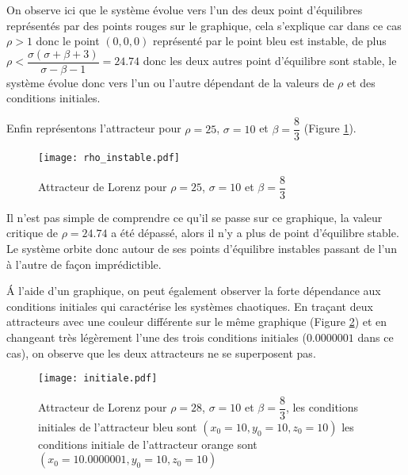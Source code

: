 On observe ici que le système évolue vers l'un des deux point d'équilibres représentés par des points rouges sur le graphique, cela s'explique car dans ce cas $\rho>1$ donc le point $(0,0,0)$ représenté par le point bleu est instable, de plus $\rho < \dfrac{\sigma(\sigma+\beta+3)}{\sigma-\beta-1}=24.74$ donc les deux autres point d'équilibre sont stable, le système évolue donc vers l'un ou l'autre dépendant de la valeurs de $\rho$ et des conditions initiales.  

Enfin représentons l'attracteur pour $\rho=25$, $\sigma=10$ et $\beta=\dfrac{8}{3}$ (Figure \ref{fig:rho_instable}).

\begin{figure}[!ht]
    \centering
    \texttt{[image: rho\_instable.pdf]}
    \caption{\label{fig:rho_instable}Attracteur de Lorenz pour $\rho=25$, $\sigma=10$ et $\beta=\dfrac{8}{3}$} 
\end{figure}

Il n'est pas simple de comprendre ce qu'il se passe sur ce graphique, la valeur critique de $\rho=24.74$ a été dépassé, alors il n'y a plus de point d'équilibre stable. Le système orbite donc autour de ses points d'équilibre instables passant de l'un à l'autre de façon imprédictible.

\'A l'aide d'un graphique, on peut également observer la forte dépendance aux conditions initiales qui caractérise les systèmes chaotiques. En traçant deux attracteurs avec une couleur différente sur le même graphique (Figure \ref{fig:initiale}) et en changeant très légèrement l'une des trois conditions initiales ($0.0000001$ dans ce cas), on observe que les deux attracteurs ne se superposent pas.

\begin{figure}[!ht]
    \centering
    \texttt{[image: initiale.pdf]}
    \caption{\label{fig:initiale}Attracteur de Lorenz pour $\rho=28$, $\sigma=10$ et $\beta=\dfrac{8}{3}$, les conditions initiales de l'attracteur bleu sont $(x_0=10,y_0=10,z_0=10)$ les conditions initiale de l'attracteur orange sont $(x_0=10.0000001,y_0=10,z_0=10)$} 
\end{figure}

